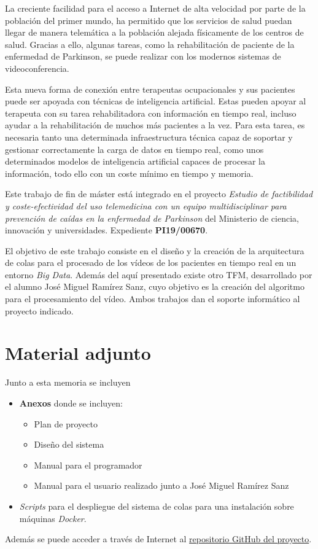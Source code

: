 
La creciente facilidad para el acceso a Internet de alta velocidad por parte de la población del primer mundo, ha permitido que los servicios de salud puedan llegar de manera telemática a la población alejada físicamente de los centros de salud. Gracias a ello,  algunas tareas, como la rehabilitación de paciente de la enfermedad de Parkinson, se puede realizar con los modernos sistemas de videoconferencia.

Esta nueva forma de conexión entre terapeutas ocupacionales y sus pacientes puede ser apoyada con técnicas de inteligencia artificial. Estas pueden apoyar al terapeuta con su tarea rehabilitadora con información en tiempo real, incluso ayudar a la rehabilitación de muchos más pacientes a la vez. Para esta tarea, es necesaria tanto una determinada infraestructura técnica capaz de soportar y gestionar correctamente la carga de datos en tiempo real, como unos determinados modelos de inteligencia artificial capaces de procesar la información, todo ello con un coste mínimo en tiempo y memoria.

Este trabajo de fin de máster está integrado en el proyecto \textit{Estudio de factibilidad y coste-efectividad del uso telemedicina con un equipo multidisciplinar para prevención de caídas en la enfermedad de Parkinson} del Ministerio de ciencia, innovación y universidades. Expediente \textbf{PI19/00670}. 

El objetivo de este trabajo consiste en el diseño y la creación de la arquitectura de colas para el procesado de los vídeos de los pacientes en tiempo real en un entorno \textit{Big Data}. Además del aquí presentado existe otro TFM, desarrollado por el alumno José Miguel Ramírez Sanz, cuyo objetivo es la creación del algoritmo para el procesamiento del vídeo. Ambos trabajos dan el soporte informático al proyecto indicado.

\section{Material adjunto}

Junto a esta memoria se incluyen

\begin{itemize}
	\item \textbf{Anexos} donde se incluyen:
	\begin{itemize}
		\item Plan de proyecto
		\item Diseño del sistema
		\item Manual para el programador
		\item Manual para el usuario realizado junto a José Miguel Ramírez Sanz
	\end{itemize}
	\item \textit{Scripts} para el despliegue del sistema de colas para una instalación sobre máquinas \textit{Docker}.
\end{itemize}

Además se puede acceder a través de Internet al \href{https://github.com/jlgarridol/TFM-IF-FIS}{repositorio GitHub del proyecto}.